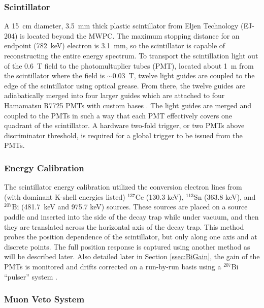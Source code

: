 \subsubsection{Scintillator}

A 15~cm diameter, 3.5~mm thick plastic scintillator \cite{plaster2012}
from Eljen Technology (EJ-204) is located beyond the
MWPC. The maximum stopping distance for an endpoint (782~keV) electron is 3.1~mm, so the
scintillator is capable of reconstructing the entire energy spectrum. To transport the
scintillation light out of the 0.6~T field to the photomultuplier tubes (PMT),
located about 1~m from the scintillator where the field is $\sim0.03$~T,
twelve light guides are coupled to the edge of the scintillator using optical grease.
From there, the twelve guides are adiabatically merged into four
larger guides which are attached to four Hamamatsu R7725 PMTs with custom bases \cite{hickerson2013}.
The light guides are merged and coupled to the PMTs in such a way that each PMT effectively
covers one quadrant of the scintillator.
A hardware two-fold trigger, or two PMTs above discriminator threshold, is required for a
global trigger to be issued from the PMTs.

\subsubsection{Energy Calibration}

The scintillator energy calibration utilized the conversion electron lines from
(with dominant K-shell energies listed) $^{137}\mathrm{Ce}$
(130.3 keV), $^{113}\mathrm{Sn}$ (363.8 keV), and $^{207}\mathrm{Bi}$ (481.7~keV and 975.7 keV)
sources. These sources are placed on a source paddle and inserted into the side of the
decay trap while under vacuum, and then they are translated across the horizontal axis of the decay
trap. This method probes the position dependence of the scintillator, but only along one axis and
at discrete points. The full position response is captured using another method as will be
described later. Also detailed later in Section \ref{ssec:BiGain}, the gain of the PMTs is monitored
and drifts corrected 
on a run-by-run basis using a $^{207}\mathrm{Bi}$ ``pulser'' system \cite{morris1976stable}.

\subsubsection{Muon Veto System}

